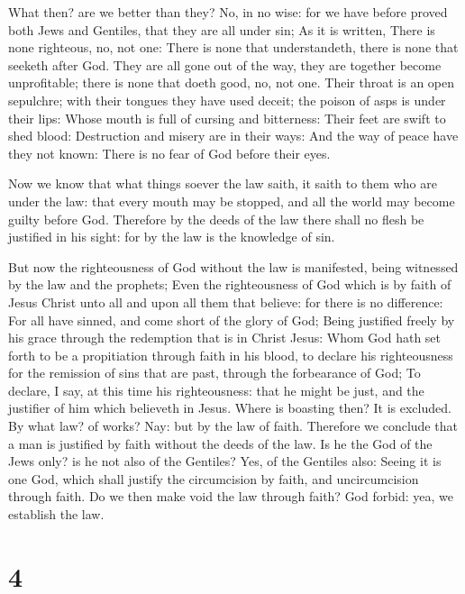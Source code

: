  What then? are we better than they? No, in no wise: for we
have before proved both Jews and Gentiles, that they are all under sin;
 As it is written, There is none righteous, no, not one:
 There is none that understandeth, there is none that
seeketh after God.  They are all gone out of the way, they
are together become unprofitable; there is none that doeth good, no, not
one.  Their throat is an open sepulchre; with their tongues
they have used deceit; the poison of asps is under their lips:
 Whose mouth is full of cursing and bitterness:
 Their feet are swift to shed blood: 
Destruction and misery are in their ways:  And the way of
peace have they not known:  There is no fear of God before
their eyes.

 Now we know that what things soever the law saith, it
saith to them who are under the law: that every mouth may be stopped,
and all the world may become guilty before God.  Therefore
by the deeds of the law there shall no flesh be justified in his sight:
for by the law is the knowledge of sin.

 But now the righteousness of God without the law is
manifested, being witnessed by the law and the prophets; 
Even the righteousness of God which is by faith of Jesus Christ unto all
and upon all them that believe: for there is no difference:
 For all have sinned, and come short of the glory of God;
 Being justified freely by his grace through the redemption
that is in Christ Jesus:  Whom God hath set forth to be a
propitiation through faith in his blood, to declare his righteousness
for the remission of sins that are past, through the forbearance of God;
 To declare, I say, at this time his righteousness: that he
might be just, and the justifier of him which believeth in Jesus.
 Where is boasting then? It is excluded. By what law? of
works? Nay: but by the law of faith.  Therefore we conclude
that a man is justified by faith without the deeds of the law.
 Is he the God of the Jews only? is he not also of the
Gentiles? Yes, of the Gentiles also:  Seeing it is one God,
which shall justify the circumcision by faith, and uncircumcision
through faith.  Do we then make void the law through faith?
God forbid: yea, we establish the law.

\hypertarget{section-3}{%
\section{4}\label{section-3}}

